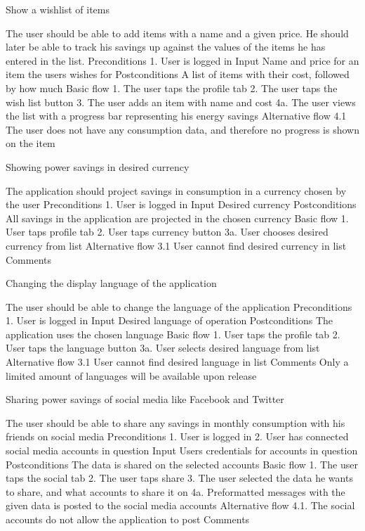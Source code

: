 Show a wishlist of items 

The user should be able to add items with a name and a given price. He should later be able to track his savings up against the values of the items he has entered in the list.
Preconditions
1. User is logged in
Input
Name and price for an item the users wishes for
Postconditions
A list of items with their cost, followed by how much %
Basic flow
1. The user taps the profile tab
2. The user taps the wish list button
3. The user adds an item with name and cost
4a. The user views the list with a progress bar representing his energy savings 
Alternative flow
4.1 The user does not have any consumption data, and therefore no progress is shown on the item



Showing power savings in desired currency

The application should project savings in consumption in a currency chosen by the user
Preconditions
1. User is logged in
Input
Desired currency
Postconditions
All savings in the application are projected in the chosen currency
Basic flow
1. User taps profile tab
2. User taps currency button
3a. User chooses desired currency from list
Alternative flow
3.1 User cannot find desired currency in list
Comments



Changing the display language of the application

The user should be able to change the language of the application
Preconditions
1. User is logged in
Input
Desired language of operation
Postconditions
The application uses the chosen language
Basic flow
1. User taps the profile tab
2. User taps the language button
3a. User selects desired language from list
Alternative flow
3.1 User cannot find desired language in list
Comments
Only a limited amount of languages will be available upon release



Sharing power savings of social media like Facebook and Twitter

The user should be able to share any savings in monthly consumption with his friends on social media
Preconditions
1. User is logged in
2. User has connected social media accounts in question
Input
Users credentials for accounts in question
Postconditions
The data is shared on the selected accounts 
Basic flow
1. The user taps the social tab
2. The user taps share
3. The user selected the data he wants to share, and what accounts to share it on
4a. Preformatted messages with the given data is posted to the social media accounts
Alternative flow
4.1. The social accounts do not allow the application to post
Comments



